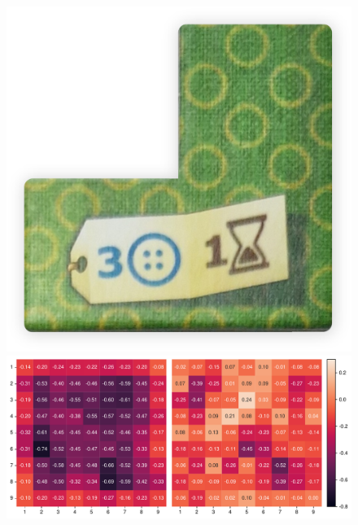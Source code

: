 \begin{figure}[!ht]
    \centering
    \begin{minipage}{.11\textwidth}
        \centering
        \includegraphics[width=0.667\linewidth]{res/pictures/assets/21-front.png}
    \end{minipage}
    \begin{minipage}{.78\textwidth}
        \centering
        \includegraphics[width=\linewidth]{res/pictures/plots/21-action-ordering.pdf}
    \end{minipage}
    \begin{minipage}{.11\textwidth}
        \hfill
    \end{minipage}
    \label{fig:action-ordering-patch-21}
\end{figure}

